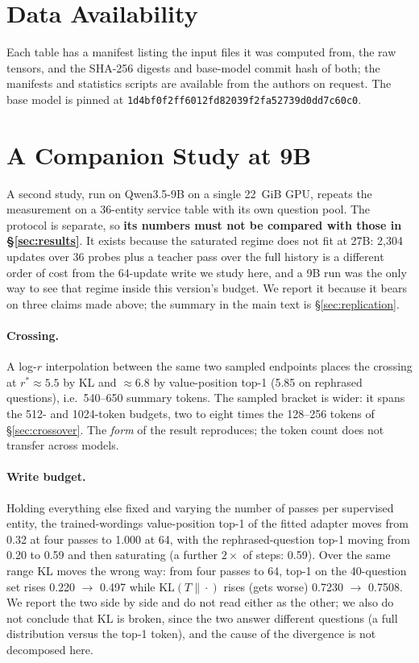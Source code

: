 \documentclass[sigconf,nonacm]{acmart}
\newcommand{\KL}{\mathrm{KL}}
\begin{document}
\section*{Data Availability}

Each table has a manifest listing the input files it was computed from, the raw tensors, and the
SHA-256 digests and base-model commit hash of both; the manifests and statistics scripts are available from the
authors on request. The base model is pinned at
\texttt{1d4bf0f2ff6012fd82039f2fa52739d0dd7c60c0}.

\appendix
\section{A Companion Study at 9B}\label{app:9b}

A second study, run on Qwen3.5-9B on a single 22~GiB GPU, repeats the measurement on a 36-entity service table
with its own question pool. The protocol is separate, so \textbf{its numbers must not be compared with those in
\S\ref{sec:results}}. It exists because the saturated regime does not fit at 27B: 2{,}304 updates over 36 probes
plus a teacher pass over the full history is a different order of cost from the 64-update write we study
here, and a 9B run was the only way to see that regime inside this version's budget. We report it because it
bears on three claims made above; the summary in the main text is \S\ref{sec:replication}.

\paragraph{Crossing.} A log-$r$ interpolation between the same two sampled endpoints places the crossing at
$r^\ast\approx5.5$ by KL and $\approx6.8$ by value-position top-1 (5.85 on rephrased questions), i.e.\ 540--650
summary tokens. The sampled bracket is wider: it spans the 512- and 1024-token budgets, two to eight times the
128--256 tokens of \S\ref{sec:crossover}. The \emph{form} of the result reproduces; the token count does not
transfer across models.

\paragraph{Write budget.} Holding everything else fixed and varying the number of passes per supervised entity,
the trained-wordings value-position top-1 of the fitted adapter moves from 0.32 at four passes to 1.000 at 64, with the
rephrased-question top-1 moving from 0.20 to 0.59 and then saturating (a further $2\times$ of steps: 0.59). Over
the same range KL moves the wrong way: from four passes to 64, top-1 on the 40-question set rises 0.220 $\to$
0.497 while $\KL(T\|\cdot)$ rises (gets worse) 0.7230 $\to$ 0.7508. We report the two side by side and do not
read either as the other; we also do not conclude that KL is broken, since the two answer different questions (a
full distribution versus the top-1 token), and the cause of the divergence is not decomposed here.
\end{document}
